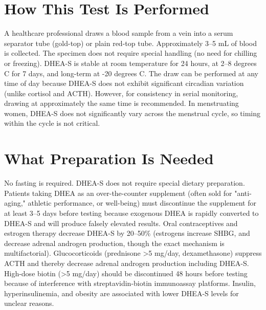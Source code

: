 \section*{How This Test Is Performed}
A healthcare professional draws a blood sample from a vein into a serum separator tube (gold-top) or plain red-top tube. Approximately 3--5 mL of blood is collected. The specimen does not require special handling (no need for chilling or freezing). DHEA-S is stable at room temperature for 24 hours, at 2--8 degrees C for 7 days, and long-term at -20 degrees C. The draw can be performed at any time of day because DHEA-S does not exhibit significant circadian variation (unlike cortisol and ACTH). However, for consistency in serial monitoring, drawing at approximately the same time is recommended. In menstruating women, DHEA-S does not significantly vary across the menstrual cycle, so timing within the cycle is not critical.

\section*{What Preparation Is Needed}
No fasting is required. DHEA-S does not require special dietary preparation. Patients taking DHEA as an over-the-counter supplement (often sold for "anti-aging," athletic performance, or well-being) must discontinue the supplement for at least 3--5 days before testing because exogenous DHEA is rapidly converted to DHEA-S and will produce falsely elevated results. Oral contraceptives and estrogen therapy decrease DHEA-S by 20--50\% (estrogens increase SHBG, and decrease adrenal androgen production, though the exact mechanism is multifactorial). Glucocorticoids (prednisone >5 mg/day, dexamethasone) suppress ACTH and thereby decrease adrenal androgen production including DHEA-S. High-dose biotin (>5 mg/day) should be discontinued 48 hours before testing because of interference with streptavidin-biotin immunoassay platforms. Insulin, hyperinsulinemia, and obesity are associated with lower DHEA-S levels for unclear reasons.

